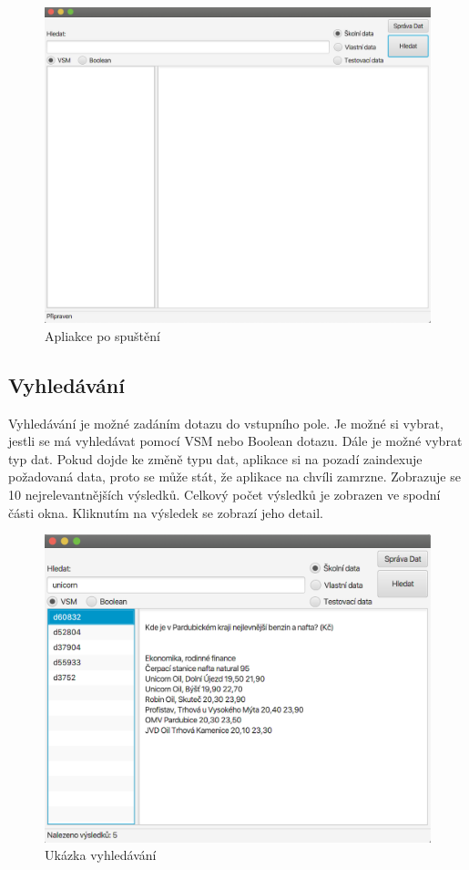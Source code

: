 \documentclass[12pt, a4paper]{article}
\begin{document}
\begin{figure}[H]
  \centering
  \includegraphics[scale=0.5]{img/start.png}
  \caption{Apliakce po spuštění}
\end{figure}
\newpage
\subsection{Vyhledávání}
\noindent Vyhledávání je možné zadáním dotazu do vstupního pole. Je možné si vybrat, jestli se má vyhledávat pomocí VSM nebo Boolean dotazu. Dále je možné vybrat typ dat. Pokud dojde ke změně typu dat, aplikace si na pozadí zaindexuje požadovaná data, proto se může stát, že aplikace na chvíli zamrzne. Zobrazuje se 10 nejrelevantnějších výsledků. Celkový počet výsledků je zobrazen ve spodní části okna. Kliknutím na výsledek se zobrazí jeho detail.

\begin{figure}[H]
  \centering
  \includegraphics[scale=0.5]{img/search.png}
  \caption{Ukázka vyhledávání}
\end{figure}
\end{document}

